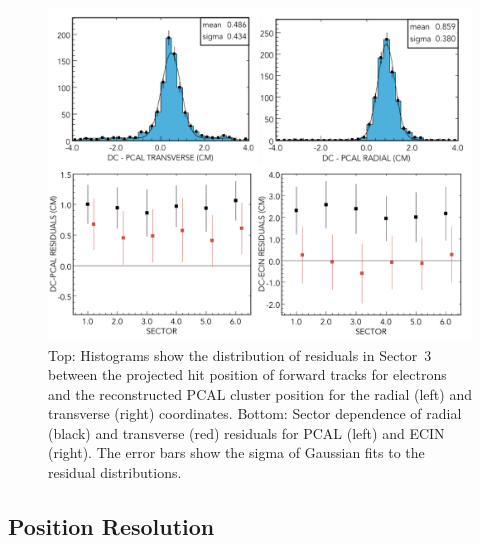 \begin{figure}[t]
\centering
\includegraphics[width=1.0\columnwidth,keepaspectratio]{img/S10_1_3.png}
\caption[]{Top: Histograms show the distribution of residuals in Sector~3 between the projected hit position of
  forward tracks for electrons and the reconstructed PCAL cluster position for the radial (left) and transverse
  (right) coordinates. Bottom: Sector dependence of radial (black) and transverse (red) residuals for PCAL (left)
  and ECIN (right). The error bars show the sigma of Gaussian fits to the residual distributions.}
\label{fig:S10_1_3}
\end{figure}

\subsection{Position Resolution}

